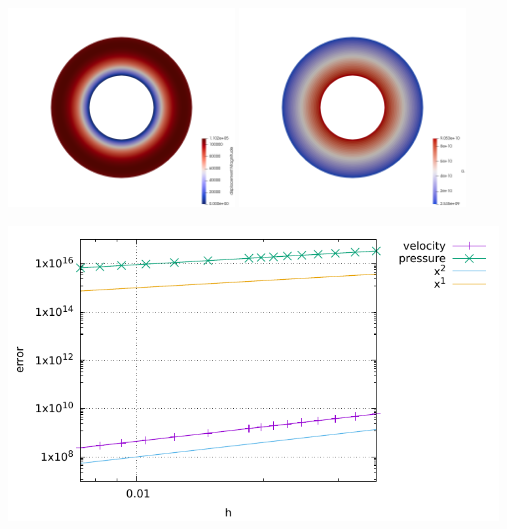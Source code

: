 \begin{center}
\includegraphics[width=6cm]{python_codes/fieldstone_36/disp}
\includegraphics[width=6cm]{python_codes/fieldstone_36/p}
\end{center}

\includegraphics[width=13cm]{python_codes/fieldstone_36/errors}




